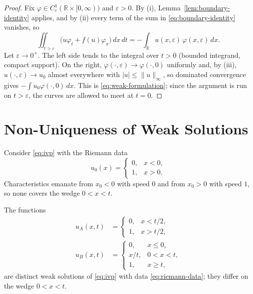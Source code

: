 \begin{proof}
Fix $\varphi\in C_c^1(\mathbb{R}\times[0,\infty))$ and $\varepsilon>0$. By (i),
Lemma~\ref{lem:boundary-identity} applies, and by (ii) every term of the sum in
\eqref{eq:boundary-identity} vanishes, so
\begin{equation*}
  \iint_{t>\varepsilon}\big(u\varphi_t+f(u)\varphi_x\big)\,dx\,dt
  = -\int_{\mathbb{R}} u(x,\varepsilon)\,\varphi(x,\varepsilon)\,dx .
\end{equation*}
Let $\varepsilon\to0^+$. The left side tends to the integral over
$t>0$ (bounded integrand, compact support). On the right,
$\varphi(\cdot,\varepsilon)\to\varphi(\cdot,0)$ uniformly and, by (iii),
$u(\cdot,\varepsilon)\to u_0$ almost everywhere with $|u|\le\|u\|_\infty$,
so dominated convergence gives $-\int u_0\varphi(\cdot,0)\,dx$. This is
\eqref{eq:weak-formulation}; since the argument is run on $t>\varepsilon$, the
curves are allowed to meet at $t=0$.
\end{proof}


\section{Non-Uniqueness of Weak Solutions}
\label{sec:nonuniqueness}

Consider \eqref{eq:ivp} with the Riemann data
\begin{equation}
  \label{eq:riemann-data}
  u_0(x) = \begin{cases} 0, & x < 0, \\ 1, & x > 0. \end{cases}
\end{equation}
Characteristics emanate from $x_0<0$ with speed $0$ and from $x_0>0$ with
speed $1$, so none covers the wedge $0<x<t$.

\begin{proposition}
\label{prop:nonuniqueness}
The functions
\begin{align}
  \label{eq:shock-solution}
  u_A(x,t) &= \begin{cases} 0, & x < t/2, \\ 1, & x > t/2, \end{cases}\\
  \label{eq:rarefaction-solution}
  u_B(x,t) &= \begin{cases}
    0, & x \le 0, \\
    x/t, & 0 < x < t, \\
    1, & x \ge t,
  \end{cases}
\end{align}
are distinct weak solutions of \eqref{eq:ivp} with data \eqref{eq:riemann-data};
they differ on the wedge $0<x<t$.
\end{proposition}

